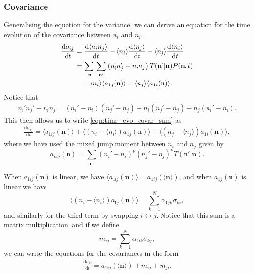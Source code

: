 \documentclass[a4paper,11pt]{report}
\numberwithin{equation}{section}
\newcommand{\diff}[2]{\frac{\mathrm{d} #1}{\mathrm{d} #2}}
\newcommand{\V}[1]{\mathbf{#1}}
\newcommand{\E}[1]{\langle #1 \rangle}
\begin{document}
\subsubsection{Covariance}
Generalising the equation for the variance, we can derive an equation for the
time evolution of the covariance between \(n_i\) and \(n_j\).
\begin{equation}
    \begin{aligned}
        \diff{\sigma_{ij}}{t}
        &= \diff{\E{n_i n_j}}{t} - \E{n_i}\diff{\E{n_j}}{t} -
        \E{n_j}\diff{\E{n_i}}{t}\\
        &= \adjustlimits\sum_{\V{n}} \sum_{\V{n}'}\left(n_i' n_j' - n_i
        n_j\right)T(\V{n}' | \V{n})P(\V{n},t)\\
        & \quad - \E{n_i}\E{a_{1j}(\V{n})} - \E{n_j}\E{a_{1i}(\V{n})}.
    \end{aligned}
    \label{eqn:time_evo_covar_sum}
\end{equation}
Notice that
\begin{align*}
    n_i' n_j' - n_i n_j = (n_i' - n_i)(n_j' - n_j) + n_i(n_j' - n_j) + n_j(n_i'
    - n_i).
\end{align*}
This then allows us to write \eqref{eqn:time_evo_covar_sum} as
\begin{equation}
    \begin{aligned}
        \diff{\sigma_{ij}}{t} = \E{a_{1 i j}(\V{n})} +
        \E{(n_i - \E{n_i})a_{1j}(\V{n})} + \E{(n_j - \E{n_j})a_{1i}(\V{n})},
    \end{aligned}
    \label{eqn:time_evo_covar_jump_moments}
\end{equation}
where we have used the mixed jump moment between \(n_i\) and \(n_j\) given by
\begin{equation}
    a_{\nu i j}(\V{n}) = \sum_{\V{n}'} (n_i' - n_i)^\nu (n_j' - n_j)^\nu
    T(\V{n}' | \V{n}).
    \label{eqn:mixed_jump_moment_i_j}
\end{equation}

When \(a_{1ij}(\V{n})\) is linear, we have \(\E{a_{1ij}(\V{n})} =
a_{1ij}(\E{\V{n}})\), and when \(a_{1j}(\V{n})\) is linear we have
\begin{equation*}
    \E{(n_i - \E{n_i})a_{1j}(\V{n})} = \sum_{k=1}^N \alpha_{1jk} \sigma_{ki},
\end{equation*}
and similarly for the third term by swapping \(i \leftrightarrow j\). Notice
that this sum is a matrix multiplication, and if we define
\begin{equation}
    m_{ij} = \sum_{k=1}^N \alpha_{1ik}\sigma_{kj},
\end{equation}
we can write the equations for the covariances in the form
\begin{equation}
    \begin{aligned}
        \diff{\sigma_{ij}}{t} = a_{1 i j}(\E{\V{n}}) + m_{ij} + m_{ji}.
    \end{aligned}
    \label{eqn:time_evo_covar_linear_jump_moments}
\end{equation}
\end{document}

